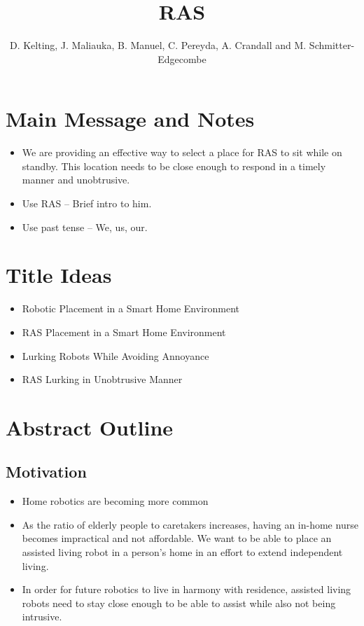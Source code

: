 \documentclass[11pt, draft, a4paper]{IEEEtran}
\author{D. Kelting, J. Maliauka, B. Manuel, C. Pereyda, A. Crandall and M. Schmitter-Edgecombe}
\title{RAS}
\begin{document}
\maketitle

\section{Main Message and Notes}
\begin{itemize}
        \item We are providing an effective way to select a place for RAS to sit while on standby. This location needs to be close enough to respond in a timely manner and unobtrusive.
        \item Use RAS -- Brief intro to him.
        \item Use past tense -- We, us, our.
\end{itemize}


\section{Title Ideas}
\begin{itemize}
        \item Robotic Placement in a Smart Home Environment
        \item RAS Placement in a Smart Home Environment 
        \item Lurking Robots While Avoiding Annoyance
        \item RAS Lurking in Unobtrusive Manner
\end{itemize}


\section{Abstract Outline}


\subsection{Motivation}
\begin{itemize}
    \item Home robotics are becoming more common
    \item As the ratio of elderly people to caretakers increases, having an 
        in-home nurse becomes impractical and not affordable. We want to be able to place an assisted living robot in a person's home in an effort to extend independent living.
    \item In order for future robotics to live in harmony with residence, assisted living robots need to stay close enough to be able to assist while also not being intrusive. 
\end{itemize}
\end{document}
